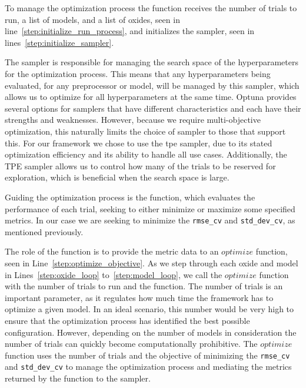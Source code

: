 To manage the optimization process the function receives the number of trials to run, a list of models, and a list of oxides, seen in line~\ref{step:initialize_run_process}, and initializes the sampler, seen in lines~\ref{step:initialize_sampler}.

The sampler is responsible for managing the search space of the hyperparameters for the optimization process.
This means that any hyperparameters being evaluated, for any preprocessor or model, will be managed by this sampler, which allows us to optimize for all hyperparameters at the same time.
Optuna provides several options for samplers that have different characteristics and each have their strengths and weaknesses.
However, because we require multi-objective optimization, this naturally limits the choice of sampler to those that support this.
For our framework we chose to use the \gls{tpe} sampler, due to its stated optimization efficiency and its ability to handle all use cases. 
Additionally, the TPE sampler allows us to control how many of the trials to be reserved for exploration, which is beneficial when the search space is large\cite{optuna_2019}.

Guiding the optimization process is the  function, which evaluates the performance of each trial, seeking to either minimize or maximize some specified metrics.
In our case we are seeking to minimize the \texttt{rmse\_cv} and \texttt{std\_dev\_cv}, as mentioned previously.

The role of the  function is to provide the metric data to an $optimize$ function, seen in Line~\ref{step:optimize_objective}.
As we step through each oxide and model in Lines~\ref{step:oxide_loop} to~\ref{step:model_loop}, we call the $optimize$ function with the number of trials to run and the  function.
The number of trials is an important parameter, as it regulates how much time the framework has to optimize a given model.
In an ideal scenario, this number would be very high to ensure that the optimization process has identified the best possible configuration.
However, depending on the number of models in consideration the number of trials can quickly become computationally prohibitive.
The $optimize$ function uses the number of trials and the objective of minimizing the \texttt{rmse\_cv} and \texttt{std\_dev\_cv} to manage the optimization process and mediating the metrics returned by the  function to the sampler. 

